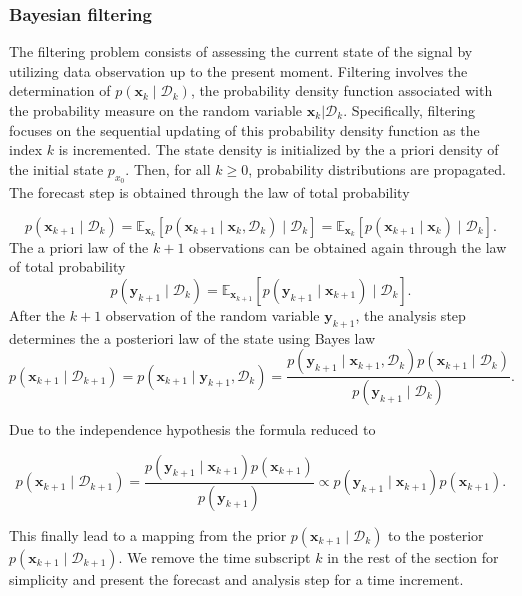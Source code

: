 \subsubsection{Bayesian filtering}

The filtering problem consists of assessing the current state of the signal by utilizing data observation up to the present moment. Filtering involves the determination of $p(\bm x_{k} \mid \mathcal{D}_{k})$, the probability density function associated with the probability measure on the random variable $\bm x_{k} | \mathcal D_{k}$. Specifically, filtering focuses on the sequential updating of this probability density function as the index $k$ is incremented.
The state density is initialized by the a priori density of the initial state $p_{x_0}$.
Then, for all $k \geq 0$, probability distributions are propagated.
The forecast step is obtained through the law of total probability

\begin{equation*}
    p(\bm x_{k+1} \mid \mathcal D_k) = \mathbb{E}_{\bm x_k}\left[p(\bm x_{k+1} \mid  \bm x_k,\mathcal{D}_k) \mid \mathcal D_k \right] = \mathbb{E}_{\bm x_k}\left[p(\bm x_{k+1} \mid \bm x_k) \mid \mathcal D_k \right].
\end{equation*}
The a priori law of the $k+1$ observations can be obtained again through the law of total probability
\begin{equation*}
    p(\bm y_{k+1} \mid \mathcal D_k) = \mathbb{E}_{\bm{x}_{k+1}}\left[p(\bm y_{k+1}\mid \bm x_{k+1}) \mid \mathcal D_k\right].
\end{equation*}
After the $k+1$ observation of the random variable $\bm y_{k+1}$, the analysis step determines the a posteriori law of the state using Bayes law
\begin{equation*}
    p(\bm x_{k+1} \mid \mathcal D_{k+1}) = p(\bm x_{k+1} \mid \bm y_{k+1}, \mathcal D_{k})  = \frac{p(\bm y_{k+1} \mid \bm x_{k+1} ,\mathcal D_k)  p(\bm x_{k+1}\mid \mathcal D_k)}{p(\bm y_{k+1}\mid \mathcal D_k)}.
\end{equation*}

Due to the independence hypothesis the formula reduced to

\begin{equation*}
    p(\bm x_{k+1} \mid \mathcal D_{k+1}) = \frac{p(\bm y_{k+1} \mid \bm x_{k+1})  p(\bm x_{k+1})}{p(\bm y_{k+1})} \propto p(\bm y_{k+1} \mid \bm x_{k+1})  p(\bm x_{k+1}).
\end{equation*}

This finally lead to a mapping from the prior $p(\bm x_{k+1} \mid \mathcal D_k)$ to the posterior $p(\bm x_{k+1} \mid \mathcal D_{k+1})$.
We remove the time subscript $k$ in the rest of the section for simplicity and present the forecast and analysis step for a time increment.

